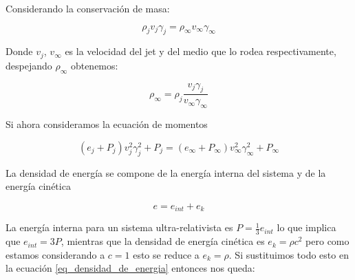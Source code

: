 \documentclass[12pt,a4paper]{book}
\begin{document}







Considerando la conservación de masa:

\begin{equation}
  \rho_j v_j \gamma_j=  \rho_{\infty} v_{\infty} \gamma_{\infty}
\end{equation}

Donde $v_j$, $v_\infty$ es la velocidad del jet y del medio que lo rodea respectivamente, despejando $\rho_{\infty}$ obtenemos:

\begin{equation}\label{eq_masa_densidad_despejada}
  \rho_\infty = \rho_j \frac{v_j \gamma_j }{v_\infty \gamma_\infty}
\end{equation}

Si ahora consideramos la ecuación de momentos

\begin{equation}
  \left( e_j + P_j\right) v^2_j \gamma^2_j + P_j = \left( e_{\infty} + P_{\infty}\right) v^2_{\infty} \gamma^2_{\infty} + P_{\infty}
\end{equation}

La densidad de energía se compone de la energía interna del sistema y de la energía cinética

\begin{equation} \label{eq_densidad_de_energia}
  e = e_{int} + e_k
\end{equation}

La energía interna para un sistema ultra-relativista es $ P = \frac{1}{3}e_{int}$ lo que implica que $e_{int} = 3P$, mientras que la densidad de energía
cinética es $e_k = \rho c^2$ pero como estamos considerando a $c = 1$ esto se reduce a $e_k = \rho$. Si sustituimos todo esto en la ecuación
\ref{eq_densidad_de_energia} entonces nos queda:
\end{document}
